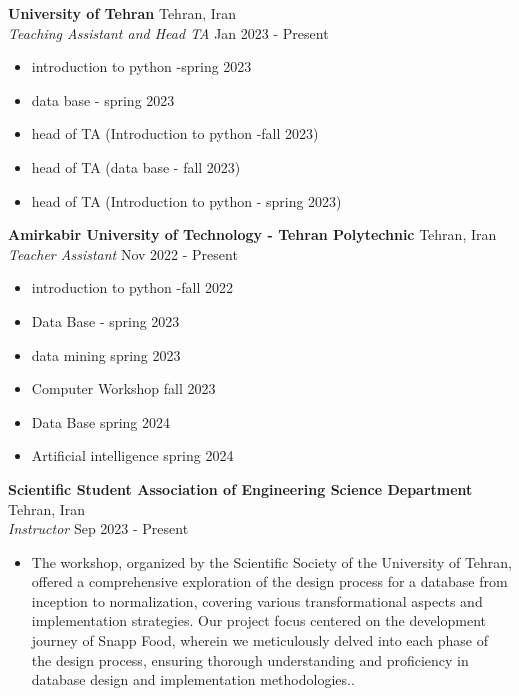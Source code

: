 \documentclass[a4paper,9pt]{extarticle}
\begin{document}
\noindent
\textbf{University of Tehran} \hfill Tehran, Iran\\ %
\textit{Teaching Assistant and Head TA} \hfill Jan 2023 - Present %
\begin{itemize}
    \item introduction to python -spring 2023
    \item  data base - spring 2023
    \item  head of TA (Introduction to python -fall 2023)
    \item  head of TA (data base - fall 2023)  
    \item  head of TA (Introduction to python - spring 2023) 
\end{itemize}

\noindent
\textbf{Amirkabir University of Technology - Tehran Polytechnic} \hfill Tehran, Iran\\ %
\textit{Teacher Assistant} \hfill Nov 2022 - Present%
\begin{itemize}
    \item introduction to python -fall 2022
    \item  Data Base - spring 2023
    \item  data  mining spring 2023
    \item  Computer Workshop fall 2023
    \item  Data Base  spring 2024
    \item  Artificial intelligence  spring 2024

\end{itemize}


\noindent
\textbf{Scientific Student Association of Engineering Science Department} \hfill Tehran, Iran\\ %
\textit{Instructor} \hfill Sep 2023 - Present %
\begin{itemize}
    \item The workshop, organized by the Scientific Society of the University of Tehran, offered a comprehensive exploration of the design process for a database from inception to normalization, covering various transformational aspects and implementation strategies. Our project focus centered on the development journey of Snapp Food, wherein we meticulously delved into each phase of the design process, ensuring thorough understanding and proficiency in database design and implementation methodologies.. %
\end{itemize}
\end{document}
